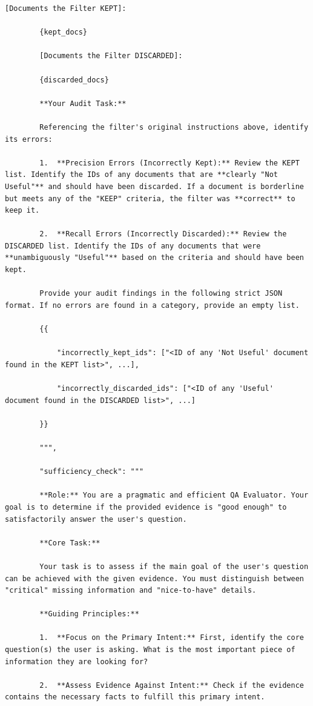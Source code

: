 \documentclass[11pt]{article}
\begin{document}
\begin{lstlisting}[basicstyle=\scriptsize\ttfamily]
        [Documents the Filter KEPT]:

        {kept_docs}

        [Documents the Filter DISCARDED]:

        {discarded_docs}

        **Your Audit Task:**

        Referencing the filter's original instructions above, identify its errors:

        1.  **Precision Errors (Incorrectly Kept):** Review the KEPT list. Identify the IDs of any documents that are **clearly "Not Useful"** and should have been discarded. If a document is borderline but meets any of the "KEEP" criteria, the filter was **correct** to keep it.

        2.  **Recall Errors (Incorrectly Discarded):** Review the DISCARDED list. Identify the IDs of any documents that were **unambiguously "Useful"** based on the criteria and should have been kept.

        Provide your audit findings in the following strict JSON format. If no errors are found in a category, provide an empty list.

        {{

            "incorrectly_kept_ids": ["<ID of any 'Not Useful' document found in the KEPT list>", ...],

            "incorrectly_discarded_ids": ["<ID of any 'Useful' document found in the DISCARDED list>", ...]

        }}

        """,

        "sufficiency_check": """

        **Role:** You are a pragmatic and efficient QA Evaluator. Your goal is to determine if the provided evidence is "good enough" to satisfactorily answer the user's question.

        **Core Task:**

        Your task is to assess if the main goal of the user's question can be achieved with the given evidence. You must distinguish between "critical" missing information and "nice-to-have" details.

        **Guiding Principles:**

        1.  **Focus on the Primary Intent:** First, identify the core question(s) the user is asking. What is the most important piece of information they are looking for?

        2.  **Assess Evidence Against Intent:** Check if the evidence contains the necessary facts to fulfill this primary intent.


\end{lstlisting}
\end{document}
